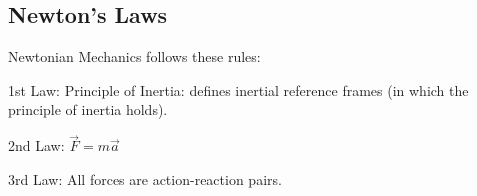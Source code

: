 \documentclass[../PhysicsFormulae.tex]{subfiles}
\begin{document}
\subsection{Newton's Laws}
Newtonian Mechanics follows these rules:

1st Law: Principle of Inertia: defines inertial reference frames (in which the principle of inertia holds). 

2nd Law: $\vec{F}=m\vec{a}$

3rd Law: All forces are action-reaction pairs. 
\end{document}
